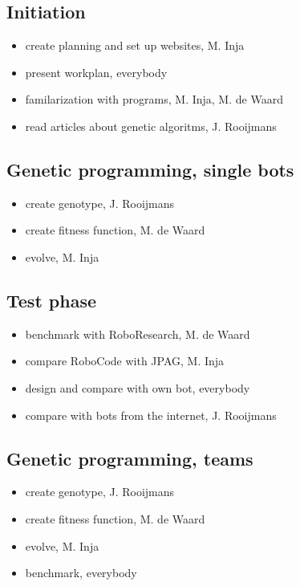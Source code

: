 \documentclass[a4paper,10pt]{article}
\begin{document}
\subsection{Initiation}
\begin{itemize}
\item create planning and set up websites, M. Inja
\item present workplan, everybody
\item familarization with programs, M. Inja, M. de Waard
\item read articles about genetic algoritms, J. Rooijmans
\end{itemize}

\subsection{Genetic programming, single bots}
\begin{itemize}
\item create genotype, J. Rooijmans
\item create fitness function, M. de Waard
\item evolve, M. Inja
\end{itemize}

\subsection{Test phase}
\begin{itemize}
\item benchmark with RoboResearch, M. de Waard
\item compare RoboCode with JPAG, M. Inja
\item design and compare with own bot, everybody
\item compare with bots from the internet, J. Rooijmans
\end{itemize}


\subsection{Genetic programming, teams}
\begin{itemize}
\item create genotype, J. Rooijmans
\item create fitness function, M. de Waard
\item evolve, M. Inja
\item benchmark, everybody
\end{itemize}
\newpage


\newpage
\appendix
\end{document}
